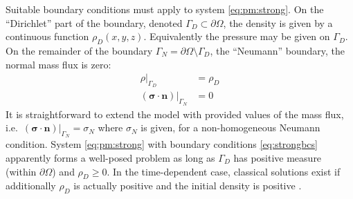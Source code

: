 \documentclass[11pt]{amsart}
\newcommand{\bn}{\mathbf{n}}
\newcommand{\bsigma}{\bm{\sigma}}
\begin{document}
Suitable boundary conditions must apply to system \eqref{eq:pm:strong}.  On the ``Dirichlet'' part of the boundary, denoted $\Gamma_D \subset \partial\Omega$, the density is given by a continuous function $\rho_D(x,y,z)$.  Equivalently the pressure may be given on $\Gamma_D$.  On the remainder of the boundary $\Gamma_N = \partial\Omega \setminus \Gamma_D$, the ``Neumann'' boundary, the normal mass flux is zero:
\begin{subequations}
\label{eq:strongbcs}
\begin{align}
\rho|_{\Gamma_D}               &= \rho_D \\
(\bsigma\cdot \bn)|_{\Gamma_N} &= 0
\end{align}
\end{subequations}
It is straightforward to extend the model with provided values of the mass flux, i.e.~$(\bsigma\cdot \bn)|_{\Gamma_N}= \sigma_N$ where $\sigma_N$ is given, for a non-homogeneous Neumann condition.  System \eqref{eq:pm:strong} with boundary conditions \eqref{eq:strongbcs} apparently forms a well-posed problem as long as $\Gamma_D$ has positive measure (within $\partial\Omega$) and $\rho_D\ge 0$.  In the time-dependent case, classical solutions exist if additionally $\rho_D$ is actually positive and the initial density is positive \citep[Theorem 3.1]{Vazquez2007}.
\end{document}
